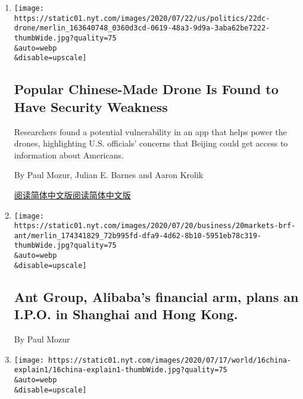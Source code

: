 \begin{enumerate}
\def\labelenumi{\arabic{enumi}.}
\item
  \href{/2020/07/23/us/politics/dji-drones-security-vulnerability.html}{}

  \texttt{[image: https://static01.nyt.com/images/2020/07/22/us/politics/22dc-drone/merlin\_163640748\_0360d3cd-0619-48a3-9d9a-3aba62be7222-thumbWide.jpg?quality=75\\\&auto=webp\\\&disable=upscale]}

  \hypertarget{popular-chinese-made-drone-is-found-to-have-security-weakness}{%
  \subsection{Popular Chinese-Made Drone Is Found to Have Security
  Weakness}\label{popular-chinese-made-drone-is-found-to-have-security-weakness}}

  Researchers found a potential vulnerability in an app that helps power
  the drones, highlighting U.S. officials' concerns that Beijing could
  get access to information about Americans.

  By Paul Mozur, Julian E. Barnes and Aaron Krolik

  \href{https://cn.nytimes.com/usa/20200724/dji-drones-security-vulnerability/}{阅读简体中文版}\href{https://cn.nytimes.com/usa/20200724/dji-drones-security-vulnerability/}{阅读简体中文版}
\item
  \href{/live/2020/07/20/business/stock-market-today-coronavirus/ant-group-alibabas-financial-arm-plans-an-ipo-in-shanghai-and-hong-kong}{}

  \texttt{[image: https://static01.nyt.com/images/2020/07/20/business/20markets-brf-ant/merlin\_174341829\_72b995fd-dfa9-4d62-8b10-5951eb78c319-thumbWide.jpg?quality=75\\\&auto=webp\\\&disable=upscale]}

  \hypertarget{ant-group-alibabas-financial-arm-plans-an-ipo-in-shanghai-and-hong-kong}{%
  \subsection{Ant Group, Alibaba's financial arm, plans an I.P.O. in
  Shanghai and Hong
  Kong.}\label{ant-group-alibabas-financial-arm-plans-an-ipo-in-shanghai-and-hong-kong}}

  By Paul Mozur
\item
  \href{/2020/07/16/world/asia/china-communist-party-travel-ban-explain.html}{}

  \texttt{[image: https://static01.nyt.com/images/2020/07/17/world/16china-explain1/16china-explain1-thumbWide.jpg?quality=75\\\&auto=webp\\\&disable=upscale]}


\end{enumerate}
